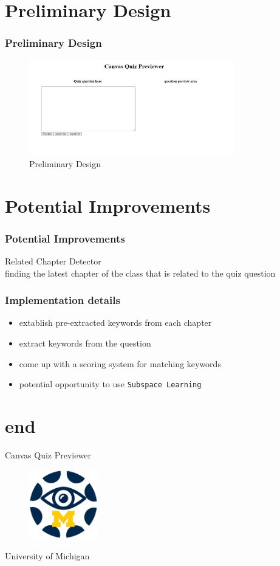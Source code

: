 \documentclass[17pt]{beamer}
\begin{document}
\section{Preliminary Design}
\begin{frame}
    \frametitle{Preliminary Design}
    \begin{figure}
        \includegraphics[width=0.8\textwidth]{img/prelim_design.png}
        \caption{Preliminary Design}
    \end{figure}
\end{frame}

\section{Potential Improvements}
\begin{frame}
    \frametitle{Potential Improvements}
    Related Chapter Detector \\
    finding the latest chapter of the class that is related to the quiz question
\end{frame}

\begin{frame}
    \frametitle{Implementation details}
    \begin{itemize}
        \item extablish pre-extracted keywords from each chapter
        \item extract keywords from the question
        \item come up with a scoring system for matching keywords
        \item potential opportunity to use \texttt{Subspace Learning} 
    \end{itemize}
\end{frame}

\section{end}
\begin{frame}
    \centering Canvas Quiz Previewer \\
    \begin{figure}
        \includegraphics[width=30mm, scale=0.05]{img/canvas-preview-logo-large.png}
    \end{figure}
    University of Michigan \\
\end{frame}
\end{document}
